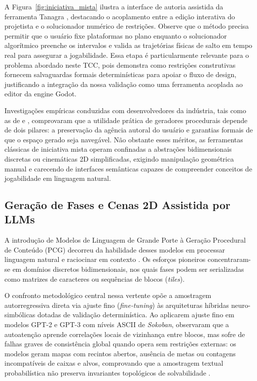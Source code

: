 A Figura~\ref{fig:iniciativa_mista} ilustra a interface de autoria assistida da ferramenta Tanagra \cite{tanagra}, destacando o acoplamento entre a edição interativa do projetista e o solucionador numérico de restrições. Observe que o método precisa permitir que o usuário fixe plataformas no plano enquanto o solucionador algorítmico preenche os intervalos e valida as trajetórias físicas de salto em tempo real para assegurar a jogabilidade. Essa etapa é particularmente relevante para o problema abordado neste TCC, pois demonstra como restrições construtivas fornecem salvaguardas formais determinísticas para apoiar o fluxo de design, justificando a integração da nossa validação como uma ferramenta acoplada ao editor da engine Godot.

Investigações empíricas conduzidas com desenvolvedores da indústria, tais como as de \textcite{lai2020towards} e \textcite{walton2020evaluating}, comprovaram que a utilidade prática de geradores procedurais depende de dois pilares: a preservação da agência autoral do usuário e garantias formais de que o espaço gerado seja navegável. Não obstante esses méritos, as ferramentas clássicas de iniciativa mista operam confinadas a abstrações bidimensionais discretas ou cinemáticas 2D simplificadas, exigindo manipulação geométrica manual e carecendo de interfaces semânticas capazes de compreender conceitos de jogabilidade em linguagem natural.

\subsection{Geração de Fases e Cenas 2D Assistida por LLMs}
\label{sec:relacionados_2d}

A introdução de Modelos de Linguagem de Grande Porte à Geração Procedural de Conteúdo (PCG) decorreu da habilidade desses modelos em processar linguagem natural e raciocinar em contexto \cite{Gallotta_2024, maleki2024procedural}. Os esforços pioneiros concentraram-se em domínios discretos bidimensionais, nos quais fases podem ser serializadas como matrizes de caracteres ou sequências de blocos (\textit{tiles}).

O confronto metodológico central nessa vertente opõe a amostragem autorregressiva direta via ajuste fino (\textit{fine-tuning}) às arquiteturas híbridas neuro-simbólicas dotadas de validação determinística. Ao aplicarem ajuste fino em modelos GPT-2 e GPT-3 com níveis ASCII de \textit{Sokoban}, \textcite{todd2023level} observaram que a autoatenção aprende correlações locais de vizinhança entre blocos, mas sofre de falhas graves de consistência global quando opera sem restrições externas: os modelos geram mapas com recintos abertos, ausência de metas ou contagens incompatíveis de caixas e alvos, comprovando que a amostragem textual probabilística não preserva invariantes topológicos de solvabilidade \cite{Gallotta_2024}.

